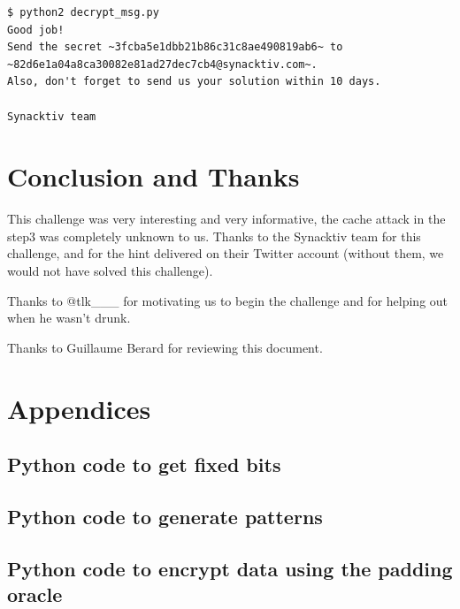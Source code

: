 \documentclass[a4paper]{article}
\begin{document}
\begin{lstlisting}[caption={Decrypt the archived message (see listing \ref{RSA_decrypt})},numbers=none,style=colortilde]
$ python2 decrypt_msg.py
Good job! 
Send the secret ~3fcba5e1dbb21b86c31c8ae490819ab6~ to ~82d6e1a04a8ca30082e81ad27dec7cb4@synacktiv.com~.      
Also, don't forget to send us your solution within 10 days.

Synacktiv team
\end{lstlisting}




\newpage
\section{Conclusion and Thanks}

This challenge was very interesting and very informative, the cache attack in the step3 was completely unknown to us.
\newline
Thanks to the Synacktiv team for this challenge, and for the hint delivered on their Twitter account (without them, we would not have solved this challenge).\newline

Thanks to @tlk\_\_\_ for motivating us to begin the challenge and for helping out when he wasn't drunk.
\newline

Thanks to Guillaume Berard for reviewing this document.


\newpage

\newpage

\section{Appendices}

\subsection{Python code to get fixed bits}

\newpage


\subsection{Python code to generate patterns}

\newpage

\subsection{Python code to encrypt data using the padding oracle}

\newpage
\end{document}
